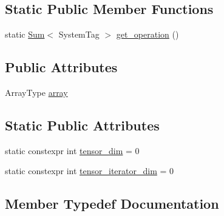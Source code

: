 \subsection*{Static Public Member Functions}
\begin{DoxyCompactItemize}
\item 
static \hyperlink{structbc_1_1tensors_1_1exprs_1_1Sum}{Sum}$<$ System\+Tag $>$ \hyperlink{structbc_1_1tensors_1_1exprs_1_1Un__Op_3_01Sum_3_01SystemTag_01_4_00_01ArrayType_01_4_a50d9f981e77cd7de0534a056a8d147e4}{get\+\_\+operation} ()
\end{DoxyCompactItemize}
\subsection*{Public Attributes}
\begin{DoxyCompactItemize}
\item 
Array\+Type \hyperlink{structbc_1_1tensors_1_1exprs_1_1Un__Op_3_01Sum_3_01SystemTag_01_4_00_01ArrayType_01_4_a42e9a2a514ab1934297d8d2e3b34bca5}{array}
\end{DoxyCompactItemize}
\subsection*{Static Public Attributes}
\begin{DoxyCompactItemize}
\item 
static constexpr int \hyperlink{structbc_1_1tensors_1_1exprs_1_1Un__Op_3_01Sum_3_01SystemTag_01_4_00_01ArrayType_01_4_a96f1486d96ba783e828404881195c541}{tensor\+\_\+dim} = 0
\item 
static constexpr int \hyperlink{structbc_1_1tensors_1_1exprs_1_1Un__Op_3_01Sum_3_01SystemTag_01_4_00_01ArrayType_01_4_af2e75e16d8290da2370d2b0141cdc0b5}{tensor\+\_\+iterator\+\_\+dim} = 0
\end{DoxyCompactItemize}


\subsection{Member Typedef Documentation}
\mbox{\label{structbc_1_1tensors_1_1exprs_1_1Un__Op_3_01Sum_3_01SystemTag_01_4_00_01ArrayType_01_4_a5c5f8513db68f6440f2fc53434f1d312}} 

